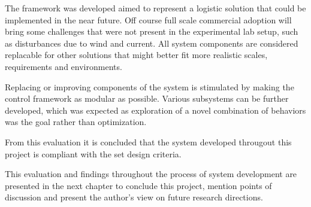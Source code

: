 The framework was developed aimed to represent a logistic solution that could be implemented in the near future. Off course full scale commercial adoption will bring some challenges that were not present in the experimental lab setup, such as disturbances due to wind and current.  All system components are considered replacable for other solutions that might better fit more realistic scales, requirements and environments. 

Replacing or improving components of the system is stimulated by making the control framework as modular as possible. Various subsystems can be further developed, which was expected as exploration of a novel combination of behaviors was the goal rather than optimization.

From this evaluation it is concluded that the system developed througout this project is compliant with the set design criteria. 


\vspace{15mm}

This evaluation and findings throughout the process of system development are presented in the next chapter to conclude this project, mention points of discussion and present the author's view on future research directions. 
